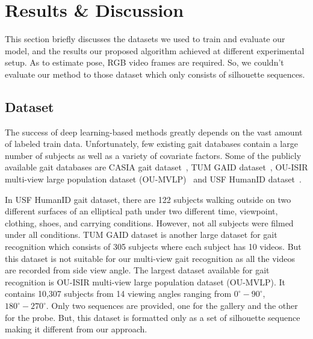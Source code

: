 \chapter{Results \& Discussion}\label{result_discussion}
This section briefly discusses the datasets we used to train and evaluate our model, and the results our proposed algorithm achieved at different experimental setup. As to estimate pose, RGB video frames are required. So, we couldn't evaluate our method to those dataset which only consists of silhouette sequences.

\section{Dataset}
The success of deep learning-based methods greatly depends on the vast amount of labeled train data. Unfortunately, few existing gait databases contain a large number of subjects as well as a variety of covariate factors. Some of the publicly available gait databases are CASIA gait dataset~\cite{Yu_06}, TUM GAID dataset~\cite{Hofmann_14}, OU-ISIR multi-view large population dataset (OU-MVLP)~\cite{Noriko_18} and USF HumanID dataset~\cite{Sarkar_05}. 

In USF HumanID gait dataset, there are 122 subjects walking outside on two different surfaces of an elliptical path under two different time, viewpoint, clothing, shoes, and carrying conditions. However, not all subjects were filmed under all conditions. TUM GAID dataset is another large dataset for gait recognition which consists of 305 subjects where each subject has 10 videos. But this dataset is not suitable for our multi-view gait recognition as all the videos are recorded from side view angle. The largest dataset available for gait recognition is OU-ISIR multi-view large population dataset (OU-MVLP). It contains 10,307 subjects from 14 viewing angles ranging from ${{0}^{\circ}-{90}^{\circ}}$, ${{180}^{\circ}-{270}^{\circ}}$. Only two sequences are provided, one for the gallery and the other for the probe. But, this dataset is formatted only as a set of silhouette sequence making it different from our approach.

